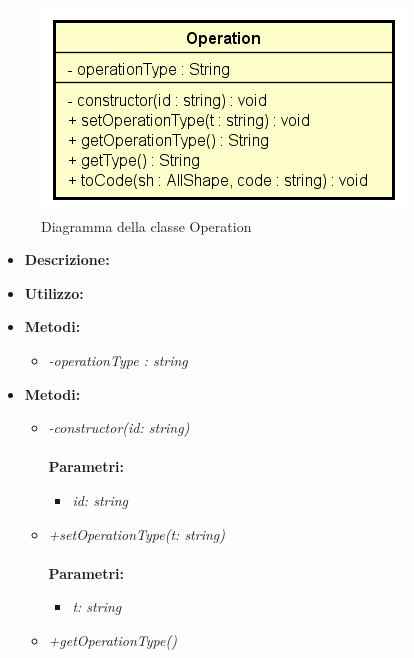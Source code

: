 \begin{figure}[h!]
	\centering
	\includegraphics[scale=0.8]{res/sections/SpecificaFrontEnd/Services/Disegnetti/operation.png}
	\caption{Diagramma della classe Operation}
\end{figure}

\begin{itemize}
	\item \textbf{Descrizione:}\\
	
	\item \textbf{Utilizzo:}\\
	
	\item \textbf{Metodi:}
		\begin{itemize}
			\item \emph{-operationType : string}\\
    		
		\end{itemize}
	\item \textbf{Metodi:}
		\begin{itemize}
			\item \emph{-constructor(id: string)}\\
    		\\
    		\textbf{Parametri:}
    		\begin{itemize}
    			\item \emph{id: string}\\
    			
    		\end{itemize}
    		\item \emph{+setOperationType(t: string)}\\
    		\\
    		\textbf{Parametri:}
    		\begin{itemize}
    			\item \emph{t: string}\\
    			
    		\end{itemize}
    		\item \emph{+getOperationType()}\\
    		

\end{itemize}
\end{itemize}
